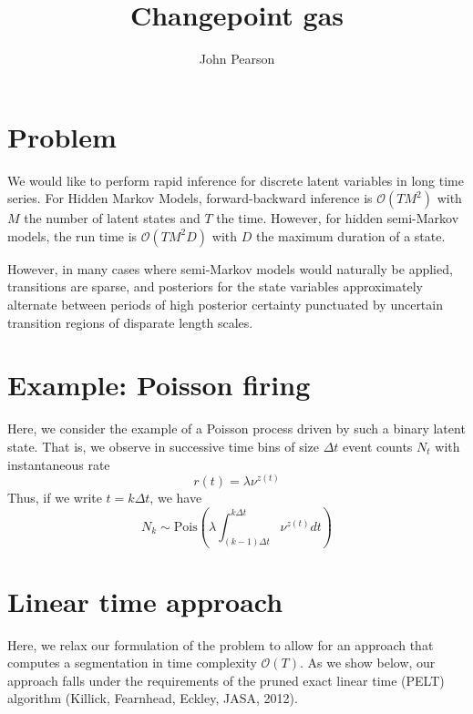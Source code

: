\documentclass[11pt]{article}
\begin{document}
\title{Changepoint gas}
\author{John Pearson}
\maketitle

\section{Problem}
We would like to perform rapid inference for discrete latent variables in long time series. For Hidden Markov Models, forward-backward inference is $\mathcal{O}(TM^2)$ with $M$ the number of latent states and $T$ the time. However, for hidden semi-Markov models, the run time is $\mathcal{O}(TM^2 D)$ with $D$ the maximum duration of a state.

However, in many cases where semi-Markov models would naturally be applied, transitions are sparse, and posteriors for the state variables approximately alternate between periods of high posterior certainty punctuated by uncertain transition regions of disparate length scales.

\section{Example: Poisson firing}
Here, we consider the example of a Poisson process driven by such a binary latent state. That is, we observe in successive time bins of size $\Delta t$ event counts $N_t$ with instantaneous rate
\begin{equation}
    r(t) = \lambda \nu^{z(t)}
\end{equation}
Thus, if we write $t = k\Delta t$, we have
\begin{equation}
    N_k \sim \text{Pois}\left(\lambda \int_{(k - 1)\Delta t}^{k\Delta t} \nu^{z(t)} dt\right)
\end{equation}

\section{Linear time approach}
Here, we relax our formulation of the problem to allow for an approach that computes a segmentation in time complexity $\mathcal{O}(T)$. As we show below, our approach falls under the requirements of the pruned exact linear time (PELT) algorithm (Killick, Fearnhead, Eckley, JASA, 2012).
\end{document}
